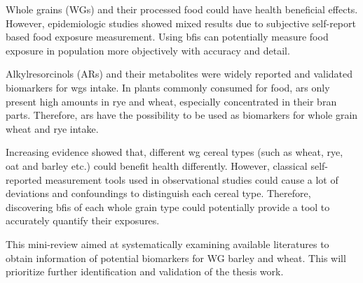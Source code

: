Whole grains (WGs) and their processed food could have health beneficial effects. However, epidemiologic studies showed mixed results due to subjective self-report based food exposure measurement\cite{ISI:000447355100002}. Using \acrfull{bfis} can potentially measure food exposure in population more objectively with accuracy and detail\cite{Scalbert2014}.

Alkylresorcinols (ARs) and their metabolites were widely reported and validated biomarkers for \acrshort{wgs} intake. 
In plants commonly consumed for food, \acrshort{ars} only present high amounts in rye and wheat, especially concentrated in their bran parts\cite{arreview2004}. Therefore, \acrshort{ars} have the possibility to be used as biomarkers for whole grain wheat and rye intake.

Increasing evidence showed that, different \acrshort{wg} cereal types (such as wheat, rye, oat and barley etc.) could benefit health differently. 
However, classical self-reported measurement tools used in observational studies could cause a lot of deviations and confoundings to distinguish each cereal type.
Therefore, discovering \acrshort{bfis} of each whole grain type could potentially provide a tool to accurately quantify their exposures. 

This mini-review aimed at systematically examining available literatures to obtain information of potential biomarkers for WG barley and wheat. This will prioritize further identification and validation of the thesis work.
